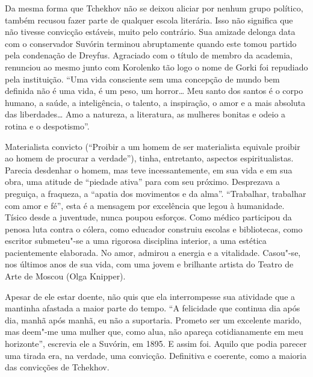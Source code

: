 Da mesma forma que Tchekhov não se deixou aliciar por nenhum grupo
político, também recusou fazer parte de qualquer escola literária. Isso
não significa que não tivesse convicção estáveis, muito pelo contrário.
Sua amizade delonga data com o conservador Suvórin terminou abruptamente
quando este tomou partido pela condenação de Dreyfus. Agraciado com o
título de membro da academia, renunciou ao mesmo junto com Korolenko tão
logo o nome de Gorki foi repudiado pela instituição. ``Uma vida
consciente sem uma concepção de mundo bem definida não é uma vida, é um
peso, um horror\ldots{} Meu santo dos santos é o corpo humano, a saúde, a
inteligência, o talento, a inspiração, o amor e a mais absoluta das
liberdades\ldots{} Amo a natureza, a literatura, as mulheres bonitas e odeio
a rotina e o despotismo''.

Materialista convicto (``Proibir a um homem de ser materialista equivale
proibir ao homem de procurar a verdade''), tinha, entretanto, aspectos
espiritualistas. Parecia desdenhar o homem, mas teve incessantemente, em
sua vida e em sua obra, uma atitude de ``piedade ativa'' para com seu
próximo. Desprezava a preguiça, a fraqueza, a ``apatia dos movimentos e
da alma''. ``Trabalhar, trabalhar com amor e fé'', esta é a mensagem por
excelência que legou à humanidade. Tísico desde a juventude, nunca
poupou esforços. Como médico participou da penosa luta contra o cólera,
como educador construiu escolas e bibliotecas, como escritor submeteu"-se
a uma rigorosa disciplina interior, a uma estética pacientemente
elaborada. No amor, admirou a energia e a vitalidade. Casou"-se, nos
últimos anos de sua vida, com uma jovem e brilhante artista do Teatro de
Arte de Moscou (Olga Knipper).

Apesar de ele estar doente, não quis que ela interrompesse sua atividade
que a mantinha afastada a maior parte do tempo. ``A felicidade que
continua dia após dia, manhã após manhã, eu não a suportaria. Prometo
ser um excelente marido, mas deem"-me uma mulher que, como alua, não
apareça cotidianamente em meu horizonte'', escrevia ele a Suvórin, em
1895. E assim foi. Aquilo que podia parecer uma tirada era, na verdade,
uma convicção. Definitiva e coerente, como a maioria das convicções de
Tchekhov.

